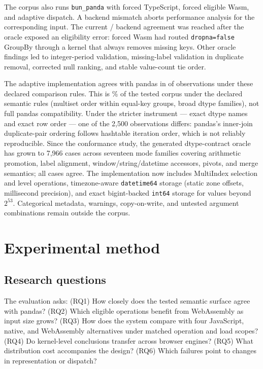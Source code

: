 \documentclass[pdflatex,sn-basic,Numbered]{sn-jnl}
\begin{document}
The corpus also runs \texttt{bun\_panda} with forced TypeScript, forced eligible Wasm, and adaptive dispatch. A backend mismatch aborts performance analysis for the corresponding input. The current \BackendPasses{}/\BackendCases{} backend agreement was reached after the oracle exposed an eligibility error: forced Wasm had routed \texttt{dropna=false} GroupBy through a kernel that always removes missing keys. Other oracle findings led to integer-period validation, missing-label validation in duplicate removal, corrected null ranking, and stable value-count tie order.

The adaptive implementation agrees with pandas in \ConformancePasses{} of \ConformanceCases{} observations under these declared comparison rules. This is \ConformancePercent{}\% of the tested corpus under the declared semantic rules (multiset order within equal-key groups, broad dtype families), not full pandas compatibility. Under the stricter instrument — exact dtype names and exact row order — one of the 2,500 observations differs: pandas's inner-join duplicate-pair ordering follows hashtable iteration order, which is not reliably reproducible. Since the conformance study, the generated dtype-contract oracle has grown to 7,966 cases across seventeen mode families covering arithmetic promotion, label alignment, window/string/datetime accessors, pivots, and merge semantics; all cases agree. The implementation now includes MultiIndex selection and level operations, timezone-aware \texttt{datetime64} storage (static zone offsets, millisecond precision), and exact bigint-backed \texttt{int64} storage for values beyond $2^{53}$. Categorical metadata, warnings, copy-on-write, and untested argument combinations remain outside the corpus.

\section{Experimental method}\label{sec:method}

\subsection{Research questions}

The evaluation asks: (RQ1) How closely does the tested semantic surface agree with pandas? (RQ2) Which eligible operations benefit from WebAssembly as input size grows? (RQ3) How does the system compare with four JavaScript, native, and WebAssembly alternatives under matched operation and load scopes? (RQ4) Do kernel-level conclusions transfer across browser engines? (RQ5) What distribution cost accompanies the design? (RQ6) Which failures point to changes in representation or dispatch?
\end{document}
